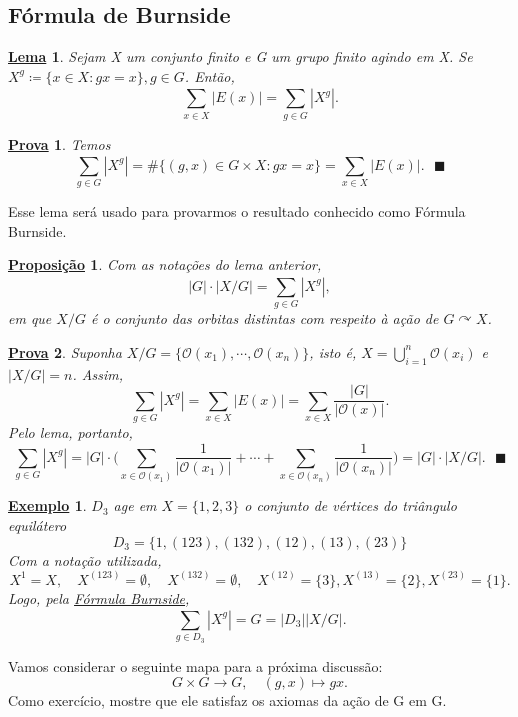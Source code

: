\documentclass{article}
\newtheorem*{prop*}{\underline{Proposi\c c\~ao}}
\newtheorem{example*}{\underline{Exemplo}}
\newtheorem*{proof*}{\underline{Prova}}
\newtheorem*{lemma*}{\underline{Lema}}
\renewcommand\qedsymbol{$\blacksquare$}
\begin{document}
\subsection{Fórmula de Burnside}
\begin{lemma*}
  Sejam X um conjunto finito e G um grupo finito agindo em X. Se \(X^{g}\coloneqq \{x\in X: gx=x\}, g\in G\).
  Então, 
    \[
      \sum\limits_{x\in X}^{}|E(x)| = \sum\limits_{g\in G}^{}|X^{g}|.
    \]
\end{lemma*}
\begin{proof*}
  Temos 
    \[
      \sum\limits_{g\in G}^{}|X^{g}| = \#\{(g, x)\in G\times X: gx=x\} = \sum\limits_{x\in X}^{}|E(x)|.\text{ \qedsymbol}
    \]
\end{proof*}
  Esse lema será usado para provarmos o resultado conhecido como Fórmula Burnside.
  \hypertarget{burnside}{
 \begin{prop*}
   Com as nota\c cões do lema anterior, 
     \[
       |G|\cdot |X/G| = \sum\limits_{g\in G}^{}|X^{g}|,
     \]
  em que \(X/G\) é o conjunto das orbitas distintas com respeito à a\c cão de \(G \curvearrowright X\).
 \end{prop*}
}
\begin{proof*}
  Suponha \(X/G=\{\mathcal{O}(x_{1}), \cdots, \mathcal{O}(x_{n})\}\), isto é, \(X=\bigcup_{i=1}^{n}{\mathcal{O}(x_{i})}\)
e \(|X/G| = n\). Assim,   
  \[
    \sum\limits_{g\in G}^{}|X^{g}| = \sum\limits_{x\in X}^{}|E(x)| = \sum\limits_{x\in X}^{}\frac{|G|}{|\mathcal{O}(x)|}.
  \]
  Pelo lema, portanto, 
  \[
    \sum\limits_{g\in G}^{}|X^{g}| = |G|\cdot \biggl(\sum\limits_{x\in \mathcal{O}(x_{1})}^{}\frac{1}{|\mathcal{O}(x_{1})|} + \cdots + \sum\limits_{x\in \mathcal{O}(x_{n})}^{}\frac{1}{|\mathcal{O}(x_{n})|}\biggr) = |G|\cdot |X/G|.\text{ \qedsymbol}
  \]
\end{proof*}
\begin{example*}
  \(D_{3}\) age em \(X=\{1, 2, 3\}\) o conjunto de vértices do triângulo equilátero 
    \[
      D_{3} = \{1, (123), (132), (12), (13), (23)\}
    \]
  Com a nota\c cão utilizada, 
    \[
      X^{1} = X,\quad X^{(123)}=\emptyset,\quad X^{(132)}=\emptyset,\quad X^{(12)}=\{3\}, X^{(13)}=\{2\}, X^{(23)}=\{1\}.
    \]
  Logo, pela \hyperlink{burnside}{Fórmula Burnside}, 
    \[
      \sum\limits_{g\in D_{3}}^{}|X^{g}| = G = |D_{3}||X/G|. 
    \]
\end{example*}
  Vamos considerar o seguinte mapa para a próxima discussão: 
    \[
      G\times{G}\rightarrow G,\quad (g, x)\mapsto gx.
    \]
  Como exercício, mostre que ele satisfaz os axiomas da a\c cão de G em G.
\end{document}
